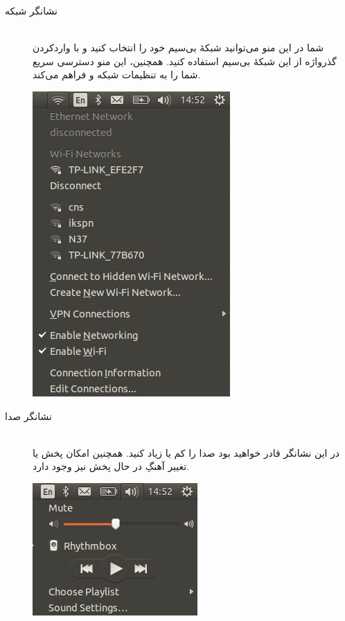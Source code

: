\begin{description}
\item[نشانگر شبکه] \hfill \\
شما در این منو می‌توانید شبکهٔ بی‌سیم خود را انتخاب کنید و با واردکردن گذرواژه از این شبکهٔ بی‌سیم استفاده کنید. همچنین، این منو دسترسی سریع شما را به تنظیمات شبکه و  فراهم می‌کند.
\begin{center}
\includegraphics[scale=0.5]{pics/19.png}
\end{center}

\item[نشانگر صدا] \hfill \\
در این نشانگر قادر خواهید بود صدا را کم یا زیاد کنید. همچنین امکان پخش یا تغییر آهنگِ در حال پخش نیز وجود دارد.
\begin{center}
\includegraphics[scale=0.5]{pics/20.png}
\end{center}


\end{description}
